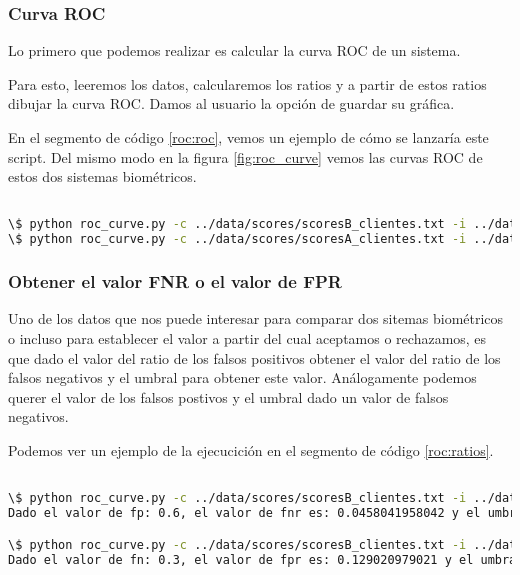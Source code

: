 \subsubsection{Curva ROC}
Lo primero que podemos realizar es calcular la curva ROC de un sistema.\par
Para esto, leeremos los datos, calcularemos los ratios y a partir de estos ratios dibujar la curva ROC. Damos al usuario la opción de guardar su gráfica. \par
En el segmento de código \ref{roc:roc}, vemos un ejemplo de cómo se lanzaría este script. Del mismo modo en la figura \ref{fig:roc_curve} vemos las curvas ROC de estos dos sistemas biométricos.\par

\begin{lstlisting}[language=bash,label=roc:roc,caption=Calculo de la curva ROC para sistemas biométricos]

\$ python roc_curve.py -c ../data/scores/scoresB_clientes.txt -i ../data/scores/scoresB_impostores.txt  -s scoresB
\$ python roc_curve.py -c ../data/scores/scoresA_clientes.txt -i ../data/scores/scoresA_impostores.txt  -s scoresA

\end{lstlisting}

\subsubsection{Obtener el valor FNR o el valor de FPR}
Uno de los datos que nos puede interesar para comparar dos sitemas biométricos o incluso para establecer el valor a partir del cual aceptamos o rechazamos, es que dado el valor del ratio de los falsos positivos obtener el valor del  ratio de los falsos negativos y el umbral para obtener este valor. Análogamente podemos querer el valor de los falsos postivos y el umbral dado un valor de falsos negativos.\par
Podemos ver un ejemplo de la ejecucición en el segmento de código \ref{roc:ratios}.\par

\begin{lstlisting}[language=bash,label=roc:ratios,caption=Obtención de ratios y umbrales]

\$ python roc_curve.py -c ../data/scores/scoresB_clientes.txt -i ../data/scores/scoresB_impostores.txt  -fp 0.6   
Dado el valor de fp: 0.6, el valor de fnr es: 0.0458041958042 y el umbral: 0.00434 

\$ python roc_curve.py -c ../data/scores/scoresB_clientes.txt -i ../data/scores/scoresB_impostores.txt  -fn 0.3 -p
Dado el valor de fn: 0.3, el valor de fpr es: 0.129020979021 y el umbral: 0.079034 

\end{lstlisting}

